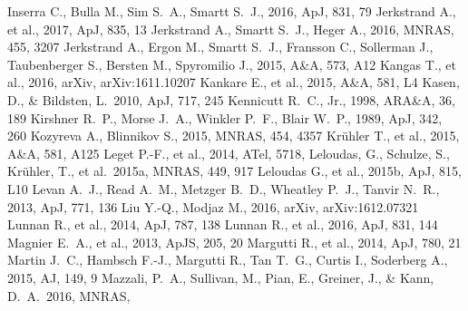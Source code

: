 \documentclass[useAMS,usenatbib]{mn2e}
\begin{document}
\begin{thebibliography}{99}
 Inserra C., Bulla M., Sim S.~A., Smartt S.~J., 2016, ApJ, 831, 79
 Jerkstrand A., et al., 2017, ApJ, 835, 13 
 Jerkstrand A., Smartt S.~J., Heger A., 2016, MNRAS, 455, 3207 
 Jerkstrand A., Ergon M., Smartt S.~J., Fransson C., Sollerman J., Taubenberger S., Bersten M., Spyromilio J., 2015, A\&A, 573, A12 
 Kangas T., et al., 2016, arXiv, arXiv:1611.10207 
 Kankare E., et al., 2015, A\&A, 581, L4 
 Kasen, D., \& Bildsten, L.\ 2010, ApJ, 717, 245
 Kennicutt R.~C., Jr., 1998, ARA\&A, 36, 189 
 Kirshner R.~P., Morse J.~A., Winkler P.~F., Blair W.~P., 1989, ApJ, 342, 260 
 Kozyreva A., Blinnikov S., 2015, MNRAS, 454, 4357 
 Kr{\"u}hler T., et al., 2015, A\&A, 581, A125 
 Leget P.-F., et al., 2014, ATel, 5718,  
 Leloudas, G., Schulze, 
S., Kr{\"u}hler, T., et al.\ 2015a, MNRAS, 449, 917 
 Leloudas G., et al., 2015b, ApJ, 815, L10 
 Levan A.~J., Read A.~M., Metzger B.~D., Wheatley P.~J., Tanvir N.~R., 2013, ApJ, 771, 136 
 Liu Y.-Q., Modjaz M., 2016, arXiv, arXiv:1612.07321 
 Lunnan R., et al., 2014, ApJ, 787, 138 
 Lunnan R., et al., 2016, ApJ, 831, 144 
 Magnier E.~A., et al., 2013, ApJS, 205, 20 
 Margutti R., et al., 2014, ApJ, 780, 21
 Martin J.~C., Hambsch F.-J., Margutti R., Tan T.~G., Curtis I., Soderberg A., 2015, AJ, 149, 9 
 Mazzali, P.~A., Sullivan, M., Pian, E., Greiner, J., \& Kann, D.~A.\ 2016, MNRAS,

\end{thebibliography}
\end{document}
